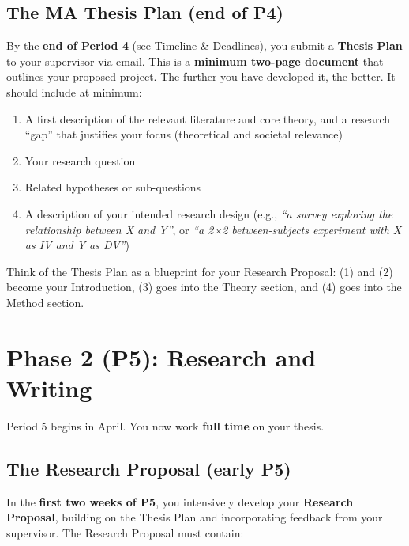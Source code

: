 \documentclass[
  11pt,
  a4paper,
]{scrbook}
\providecommand{\tightlist}{%
  \setlength{\itemsep}{0pt}\setlength{\parskip}{0pt}}\usepackage{longtable,booktabs,array}
\begin{document}
\subsection{The MA Thesis Plan (end of
P4)}\label{the-ma-thesis-plan-end-of-p4}

By the \textbf{end of Period 4} (see \href{timeline.qmd}{Timeline \&
Deadlines}), you submit a \textbf{Thesis Plan} to your supervisor via
email. This is a \textbf{minimum two-page document} that outlines your
proposed project. The further you have developed it, the better. It
should include at minimum:

\begin{enumerate}
\def\labelenumi{\arabic{enumi}.}
\tightlist
\item
  A first description of the relevant literature and core theory, and a
  research ``gap'' that justifies your focus (theoretical and societal
  relevance)
\item
  Your research question
\item
  Related hypotheses or sub-questions
\item
  A description of your intended research design (e.g., \emph{``a survey
  exploring the relationship between X and Y''}, or \emph{``a 2×2
  between-subjects experiment with X as IV and Y as DV''})
\end{enumerate}

Think of the Thesis Plan as a blueprint for your Research Proposal: (1)
and (2) become your Introduction, (3) goes into the Theory section, and
(4) goes into the Method section.

\section{Phase 2 (P5): Research and
Writing}\label{phase-2-p5-research-and-writing}

Period 5 begins in April. You now work \textbf{full time} on your
thesis.

\subsection{The Research Proposal (early
P5)}\label{the-research-proposal-early-p5}

In the \textbf{first two weeks of P5}, you intensively develop your
\textbf{Research Proposal}, building on the Thesis Plan and
incorporating feedback from your supervisor. The Research Proposal must
contain:
\end{document}
